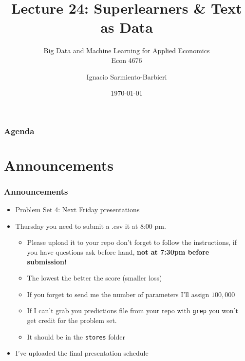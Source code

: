 \documentclass[
  shownotes,
  xcolor={svgnames},
  hyperref={colorlinks,citecolor=DarkBlue,linkcolor=DarkRed,urlcolor=DarkBlue}
  , aspectratio=169]{beamer}
\begin{document}
 
\title[Lecture 24]{Lecture 24:  Superlearners \& Text as Data}
\subtitle{Big Data and Machine Learning for Applied Economics \\ Econ 4676}
\date{\today}

\author[Sarmiento-Barbieri]{Ignacio Sarmiento-Barbieri}


\begin{frame}[noframenumbering]
\maketitle
\end{frame}






\begin{frame}
\frametitle{Agenda}

\tableofcontents

\end{frame}

\section{Announcements}
\begin{frame}
\frametitle{Announcements}

\begin{itemize}
\item Problem Set 4: Next Friday presentations
\medskip
\item Thursday you need to submit a .csv it at 8:00 pm. 
  \begin{itemize}
    \item Please upload it to your repo don't forget to follow the instructions, if you have questions ask before hand, {\bf not at 7:30pm before submission!} 
    \medskip
    \item The lowest the better the score (smaller loss)
    \medskip
    \item If you forget to send me the number of parameters I'll assign $100,000$
    \medskip
    \item If I can't grab you predictions file from your repo with  \texttt{grep} you won't get credit for the problem set.
    \medskip 
    \item It should be in the \texttt{stores} folder
  \end{itemize}
\medskip
\item I've uploaded the final presentation schedule
\end{itemize}

\end{frame}
\end{document}
